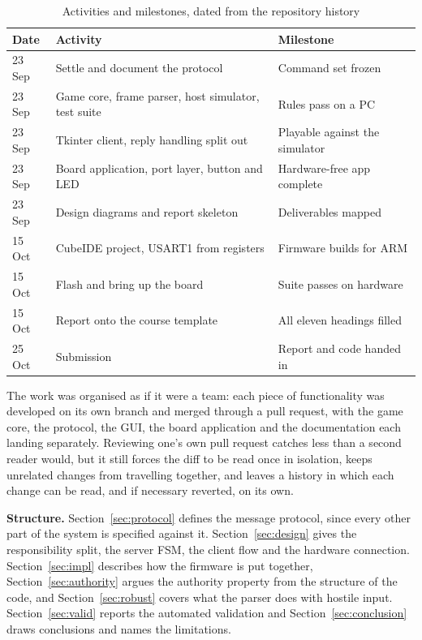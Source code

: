 \begin{table}[htbp]
\caption{Activities and milestones, dated from the repository history}
\label{tab:plan}
\centering
\footnotesize
\begin{tabular}{p{0.8cm}p{3.6cm}p{2.7cm}}
\hline
\textbf{Date} & \textbf{Activity} & \textbf{Milestone} \\
\hline
23 Sep & Settle and document the protocol & Command set frozen \\
23 Sep & Game core, frame parser, host simulator, test suite & Rules pass on a PC \\
23 Sep & Tkinter client, reply handling split out & Playable against the simulator \\
23 Sep & Board application, port layer, button and LED & Hardware-free app complete \\
23 Sep & Design diagrams and report skeleton & Deliverables mapped \\
15 Oct & CubeIDE project, USART1 from registers & Firmware builds for ARM \\
15 Oct & Flash and bring up the board & Suite passes on hardware \\
15 Oct & Report onto the course template & All eleven headings filled \\
25 Oct & Submission & Report and code handed in \\
\hline
\end{tabular}
\end{table}

The work was organised as if it were a team: each piece of functionality was
developed on its own branch and merged through a pull request, with the game
core, the protocol, the GUI, the board application and the documentation each
landing separately. Reviewing one's own pull request catches less than a second
reader would, but it still forces the diff to be read once in isolation, keeps
unrelated changes from travelling together, and leaves a history in which each
change can be read, and if necessary reverted, on its own.

\textbf{Structure.} Section~\ref{sec:protocol} defines the message protocol,
since every other part of the system is specified against it.
Section~\ref{sec:design} gives the responsibility split, the server FSM, the
client flow and the hardware connection. Section~\ref{sec:impl} describes how
the firmware is put together, Section~\ref{sec:authority} argues the authority
property from the structure of the code, and Section~\ref{sec:robust} covers
what the parser does with hostile input. Section~\ref{sec:valid} reports the
automated validation and Section~\ref{sec:conclusion} draws conclusions and
names the limitations.
